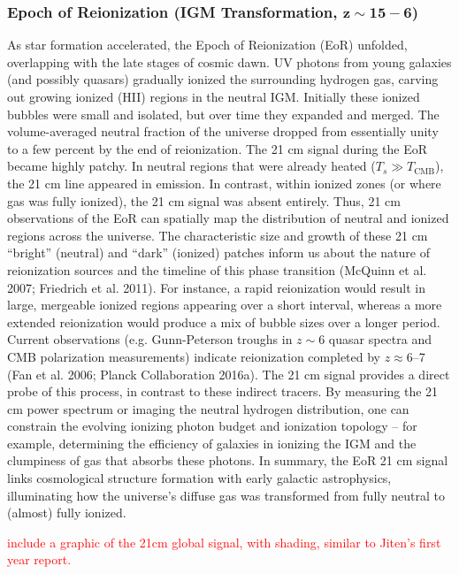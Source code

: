 \documentclass[floats,floatfix,showpacs,amssymb,prd,superscriptaddress,nofootinbib]{revtex4-2} %
\newcommand{\red}{\textcolor{red}}
\begin{document}
\subsubsection{Epoch of Reionization (IGM Transformation, $\mathbf{z \sim 15-6}$)}
As star formation accelerated, the Epoch of Reionization (EoR) unfolded, overlapping with the late stages of cosmic dawn. UV photons from young galaxies (and possibly quasars) gradually ionized the surrounding hydrogen gas, carving out growing ionized (HII) regions in the neutral IGM. Initially these ionized bubbles were small and isolated, but over time they expanded and merged. The volume-averaged neutral fraction of the universe dropped from essentially unity to a few percent by the end of reionization. The 21 cm signal during the EoR became highly patchy. In neutral regions that were already heated ($T_s \gg T_{\text{CMB}}$), the 21 cm line appeared in emission. In contrast, within ionized zones (or where gas was fully ionized), the 21 cm signal was absent entirely. Thus, 21 cm observations of the EoR can spatially map the distribution of neutral and ionized regions across the universe. The characteristic size and growth of these 21 cm “bright” (neutral) and “dark” (ionized) patches inform us about the nature of reionization sources and the timeline of this phase transition (McQuinn et al. 2007; Friedrich et al. 2011). For instance, a rapid reionization would result in large, mergeable ionized regions appearing over a short interval, whereas a more extended reionization would produce a mix of bubble sizes over a longer period. Current observations (e.g. Gunn-Peterson troughs in $z\sim6$ quasar spectra and CMB polarization measurements) indicate reionization completed by $z\approx6$–7 (Fan et al. 2006; Planck Collaboration 2016a). The 21 cm signal provides a direct probe of this process, in contrast to these indirect tracers. By measuring the 21 cm power spectrum or imaging the neutral hydrogen distribution, one can constrain the evolving ionizing photon budget and ionization topology – for example, determining the efficiency of galaxies in ionizing the IGM and the clumpiness of gas that absorbs these photons. 
In summary, the EoR 21 cm signal links cosmological structure formation with early galactic astrophysics, illuminating how the universe’s diffuse gas was transformed from fully neutral to (almost) fully ionized.

\red{include a graphic of the 21cm global signal, with shading, similar to Jiten's first year report.}
\end{document}
